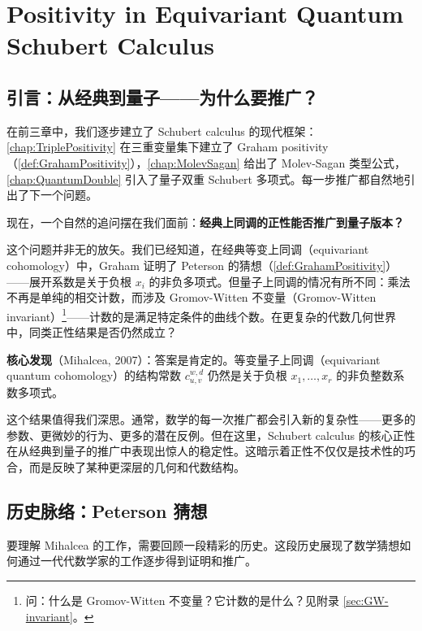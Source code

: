 
\chapter{Positivity in Equivariant Quantum Schubert Calculus}
\label{chap:EquivariantQuantumPositivity}

\section{引言：从经典到量子——为什么要推广？}
\label{sec:FromClassicalToQuantum}

在前三章中，我们逐步建立了 Schubert calculus 的现代框架：\cref{chap:TriplePositivity} 在三重变量集下建立了 Graham positivity（\cref{def:GrahamPositivity}），\cref{chap:MolevSagan} 给出了 Molev-Sagan 类型公式，\cref{chap:QuantumDouble} 引入了量子双重 Schubert 多项式。每一步推广都自然地引出了下一个问题。

现在，一个自然的追问摆在我们面前：\textbf{经典上同调的正性能否推广到量子版本？}

这个问题并非无的放矢。我们已经知道，在经典等变上同调（equivariant cohomology）中，Graham 证明了 Peterson 的猜想（\cref{def:GrahamPositivity}）——展开系数是关于负根 $x_i$ 的非负多项式。但量子上同调的情况有所不同：乘法不再是单纯的相交计数，而涉及 Gromov-Witten 不变量（Gromov-Witten invariant）\footnote{问：什么是 Gromov-Witten 不变量？它计数的是什么？见附录 \cref{sec:GW-invariant}。}——计数的是满足特定条件的曲线个数。在更复杂的代数几何世界中，同类正性结果是否仍然成立？

\textbf{核心发现}（Mihalcea, 2007）：答案是肯定的。等变量子上同调（equivariant quantum cohomology）的结构常数 $c_{u,v}^{w,d}$ 仍然是关于负根 $x_1, \ldots, x_r$ 的非负整数系数多项式。

这个结果值得我们深思。通常，数学的每一次推广都会引入新的复杂性——更多的参数、更微妙的行为、更多的潜在反例。但在这里，Schubert calculus 的核心正性在从经典到量子的推广中表现出惊人的稳定性。这暗示着正性不仅仅是技术性的巧合，而是反映了某种更深层的几何和代数结构。

\section{历史脉络：Peterson 猜想}
\label{sec:PetersonConjectureHistory}

要理解 Mihalcea 的工作，需要回顾一段精彩的历史。这段历史展现了数学猜想如何通过一代代数学家的工作逐步得到证明和推广。

